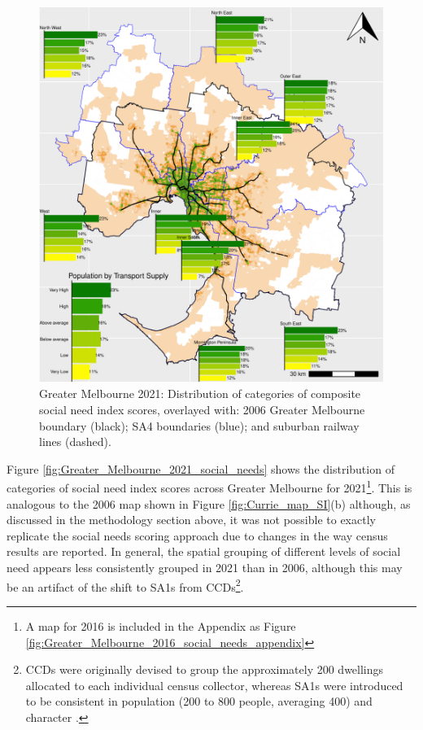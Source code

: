 \documentclass[preprint, 3p,
authoryear]{elsarticle} %
\begin{document}
\begin{figure}
\centering
\includegraphics{ReynoldsCurrieQu2024_files/figure-latex/Greater_Melbourne_2021_social_needs-1.pdf}
\caption{Greater Melbourne 2021: Distribution of categories of composite
social need index scores, overlayed with: 2006 Greater Melbourne
boundary (black); SA4 boundaries (blue); and suburban railway lines
(dashed).}
\end{figure}

Figure \ref{fig:Greater_Melbourne_2021_social_needs} shows the
distribution of categories of social need index scores across Greater
Melbourne for 2021\footnote{A map for 2016 is included in the Appendix
  as Figure \ref{fig:Greater_Melbourne_2016_social_needs_appendix}}.
This is analogous to the 2006 map shown in Figure
\ref{fig:Currie_map_SI}(b) although, as discussed in the methodology
section above, it was not possible to exactly replicate the
\citet{currie2010identifying} social needs scoring approach due to
changes in the way census results are reported. In general, the spatial
grouping of different levels of social need appears less consistently
grouped in 2021 than in 2006, although this may be an artifact of the
shift to SA1s from CCDs\footnote{CCDs were originally devised to group
  the approximately 200 dwellings allocated to each individual census
  collector, whereas SA1s were introduced to be consistent in population
  (200 to 800 people, averaging 400) and character
  \citep{ABS_SA1s_CCDs}.}.
\end{document}
